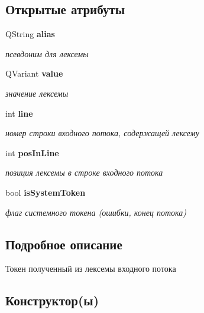 \subsection*{Открытые атрибуты}
\begin{DoxyCompactItemize}
\item 
\-Q\-String {\bf alias}\label{structToken_ab8e8a13e841bf54bf1dc802eb4557d3d}

\begin{DoxyCompactList}\small\item\em псевдоним для лексемы \end{DoxyCompactList}\item 
\-Q\-Variant {\bf value}\label{structToken_a3cb4743f3dd1dbc6bdfc84c415e9b37b}

\begin{DoxyCompactList}\small\item\em значение лексемы \end{DoxyCompactList}\item 
int {\bf line}\label{structToken_a4b96c2a31d7c374fd2bd1986794f80dd}

\begin{DoxyCompactList}\small\item\em номер строки входного потока, содержащей лексему \end{DoxyCompactList}\item 
int {\bf pos\-In\-Line}\label{structToken_aab7e25636c4dd8e2f873abd5b5435a17}

\begin{DoxyCompactList}\small\item\em позиция лексемы в строке входного потока \end{DoxyCompactList}\item 
bool {\bf is\-System\-Token}\label{structToken_ac77d1174920f71e83091e6d009b1f8a4}

\begin{DoxyCompactList}\small\item\em флаг системного токена (ошибки, конец потока) \end{DoxyCompactList}\end{DoxyCompactItemize}


\subsection{Подробное описание}
Токен полученный из лексемы входного потока 

\subsection{Конструктор(ы)}
